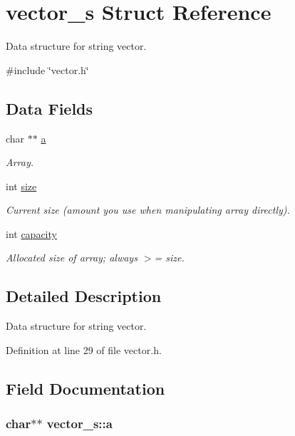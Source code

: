 \hypertarget{structvector__s}{
\section{vector\_\-s Struct Reference}
\label{structvector__s}
}


Data structure for string vector.  




{\ttfamily \#include \char`\"{}vector.h\char`\"{}}

\subsection*{Data Fields}
\begin{DoxyCompactItemize}
\item 
char $\ast$$\ast$ \hyperlink{structvector__s_a106b319236f6163ae3ae4ae132221607}{a}
\begin{DoxyCompactList}\small\item\em Array. \item\end{DoxyCompactList}\item 
int \hyperlink{structvector__s_a817205845ca0191af990f05b62e587b9}{size}
\begin{DoxyCompactList}\small\item\em Current size (amount you use when manipulating array directly). \item\end{DoxyCompactList}\item 
int \hyperlink{structvector__s_a8db5892656cbc148d5bf3b8fcb144df9}{capacity}
\begin{DoxyCompactList}\small\item\em Allocated size of array; always $>$= size. \item\end{DoxyCompactList}\end{DoxyCompactItemize}


\subsection{Detailed Description}
Data structure for string vector. 

Definition at line 29 of file vector.h.



\subsection{Field Documentation}
\hypertarget{structvector__s_a106b319236f6163ae3ae4ae132221607}{
\subsubsection[{a}]{\setlength{\rightskip}{0pt plus 5cm}char$\ast$$\ast$ {\bf vector\_\-s::a}}}
\label{structvector__s_a106b319236f6163ae3ae4ae132221607}


